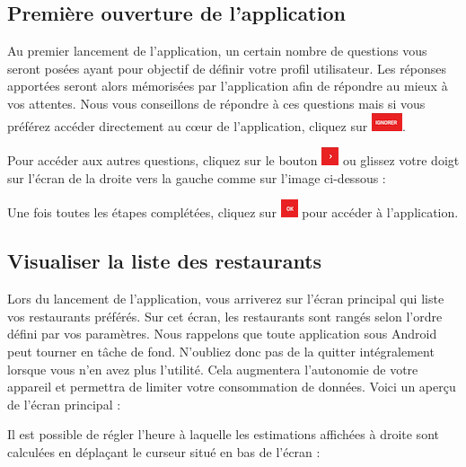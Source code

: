 \subsection{Première ouverture de l'application}
Au premier lancement de l'application, un certain nombre de questions vous
seront posées ayant pour objectif de définir votre profil utilisateur. Les 
réponses apportées seront alors mémorisées par l'application afin de
répondre au mieux à vos attentes. Nous vous conseillons de répondre à ces 
questions mais si vous préférez accéder directement au c\oe ur de l'application, 
cliquez sur \includegraphics{images/ignorer.png}. 

Pour accéder aux autres questions, cliquez sur le bouton \includegraphics{images/next.png}
ou glissez votre doigt sur l'écran de la droite vers la gauche comme sur 
l'image ci-dessous :

Une fois toutes les étapes complétées, cliquez sur \includegraphics{images/ok.png} pour 
accéder à l'application. 

\subsection{Visualiser la liste des restaurants}
Lors du lancement de l'application, vous arriverez sur l'écran principal qui
liste vos restaurants préférés. Sur cet écran, les restaurants sont rangés selon l'ordre défini par vos paramètres. Nous
rappelons que toute application sous Android peut tourner en tâche de fond.
N'oubliez donc pas de la quitter intégralement lorsque vous n'en avez plus l'utilité.
Cela augmentera l'autonomie de votre appareil et permettra de limiter votre
consommation de données. 
Voici un aperçu de l'écran principal :

Il est possible de régler l'heure à laquelle
les estimations affichées à droite sont calculées en déplaçant le curseur situé
en bas de l'écran : 
 
